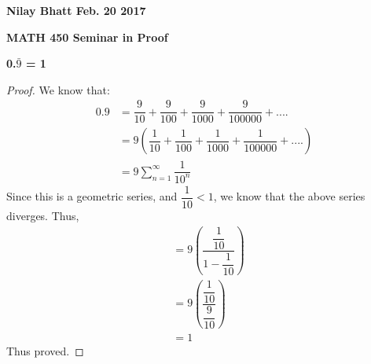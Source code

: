 \documentclass[12pt, fullpage]{article}
\begin{document}
\begin{flushleft}
\textbf{Nilay Bhatt Feb. 20 2017}		
\end{flushleft}

\begin{center}
{\bf MATH 450 Seminar in Proof}
\end{center}

\begin{center}
\textbf{0.$\bar{9}$ = 1}
\end{center}

\begin{proof}
We know that:
\begin{equation}
\begin{split}
0.9 &= \dfrac{9}{10} + \dfrac{9}{100} + \dfrac{9}{1000} + \dfrac{9}{100000} + ....\\
&= 9\left(\dfrac{1}{10} + \dfrac{1}{100} + \dfrac{1}{1000} + \dfrac{1}{100000} + ....\right)\\
&= 9 \sum_{n=1}^{\infty}\dfrac{1}{10^n}
\end{split}
\end{equation}
Since this is a geometric series, and $\dfrac{1}{10} < 1$, we know that the above series diverges. Thus,\\
\begin{equation}
\begin{split}
&= 9 \left(\dfrac{\dfrac{1}{10}}{1-\dfrac{1}{10}}\right)\\
&= 9 \left(\dfrac{\dfrac{1}{10}}{\dfrac{9}{10}}\right) \\
&= 1
\end{split}
\end{equation}
Thus proved.

\end{proof}
\end{document}
